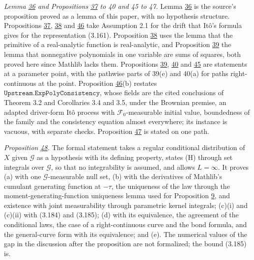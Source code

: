 \documentclass[11pt]{article}
\begin{document}
\emph{Lemma \hyperref[res:Lemma-36]{36} and Propositions \hyperref[res:Proposition-37]{37} to 40 and 45 to 47.} Lemma \hyperref[res:Lemma-36]{36} is the source's proposition proved as a lemma of this paper, with no hypothesis structure. Propositions \hyperref[res:Proposition-37]{37}, \hyperref[res:Proposition-38]{38} and \hyperref[res:Proposition-46]{46} take Assumption 2.1 for the drift that Itô's formula gives for the representation (3.161). Proposition \hyperref[res:Proposition-38]{38} uses the lemma that the primitive of a real-analytic function is real-analytic, and Proposition \hyperref[res:Proposition-39]{39} the lemma that nonnegative polynomials in one variable are sums of squares, both proved here since Mathlib lacks them. Propositions \hyperref[res:Proposition-39]{39}, \hyperref[res:Proposition-40]{40} and \hyperref[res:Proposition-45]{45} are statements at a parameter point, with the pathwise parts of 39(e) and 40(a) for paths right-continuous at the point. Proposition \hyperref[res:Proposition-46]{46}(b) restates \(\texttt{Upstream.ExpPolyConsistency}\), whose fields are the cited conclusions of \cite{filipovic2000exponential} Theorem 3.2 and Corollaries 3.4 and 3.5, under the Brownian premise, an adapted driver-form Itô process with \(\mathcal F_0\)-measurable initial value, boundedness of the family and the consistency equation almost everywhere; its instance is vacuous, with separate checks. Proposition \hyperref[res:Proposition-47]{47} is stated on one path.

\emph{Proposition \hyperref[res:Proposition-48]{48}.} The formal statement takes a regular conditional distribution of \(X\) given \(\mathcal G\) as a hypothesis with its defining property, states (H) through set integrals over \(\mathcal G\), so that no integrability is assumed, and allows \(L=\infty\). It proves (a) with one \(\mathcal G\)-measurable null set, (b) with the derivatives of Mathlib's cumulant generating function at \(-\tau\), the uniqueness of the law through the moment-generating-function uniqueness lemma used for Proposition \hyperref[res:Proposition-9]{9}, and existence with joint measurability through parametric kernel integrals; (c)(i) and (c)(ii) with (3.184) and (3.185); (d) with its equivalence, the agreement of the conditional laws, the case of a right-continuous curve and the bond formula, and the general-curve form with its equivalence; and (e). The numerical values of the gap in the discussion after the proposition are not formalized; the bound (3.185) is.
\end{document}
